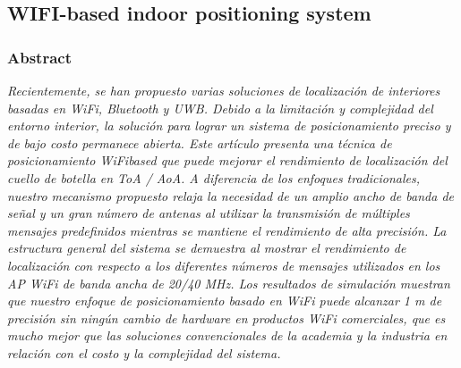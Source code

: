 \subsection{WIFI-based indoor positioning system}
\subsubsection{Abstract}	

\emph{Recientemente, se han propuesto varias soluciones de localización de interiores basadas en WiFi, Bluetooth y UWB. Debido a la limitación y complejidad del entorno interior, la solución para lograr un sistema de posicionamiento preciso y de bajo costo permanece abierta. Este artículo presenta una técnica de posicionamiento WiFibased que puede mejorar el rendimiento de localización del cuello de botella en ToA / AoA. A diferencia de los enfoques tradicionales, nuestro mecanismo propuesto relaja la necesidad de un amplio ancho de banda de señal y un gran número de antenas al utilizar la transmisión de múltiples mensajes predefinidos mientras se mantiene el rendimiento de alta precisión. La estructura general del sistema se demuestra al mostrar el rendimiento de localización con respecto a los diferentes números de mensajes utilizados en los AP WiFi de banda ancha de 20/40 MHz. Los resultados de simulación muestran que nuestro enfoque de posicionamiento basado en WiFi puede alcanzar 1 m de precisión sin ningún cambio de hardware en productos WiFi comerciales, que es mucho mejor que las soluciones convencionales de la academia y la industria en relación con el costo y la complejidad del sistema.}\\

